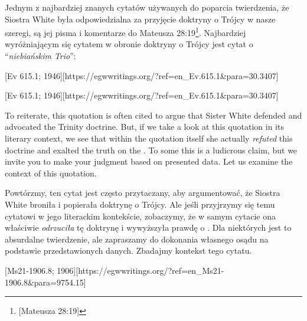 Jednym z najbardziej znanych cytatów używanych do poparcia twierdzenia, że Siostra White była odpowiedzialna za przyjęcie doktryny o Trójcy w nasze szeregi, są jej pisma i komentarze do Mateusza 28:19\footnote{[Mateusza 28:19]}. Najbardziej wyróżniającym się cytatem w obronie doktryny o Trójcy jest cytat o “\textit{niebiańskim Trio}”:


[Ev 615.1; 1946][https://egwwritings.org/?ref=en\_Ev.615.1&para=30.3407]


[Ev 615.1; 1946][https://egwwritings.org/?ref=en\_Ev.615.1&para=30.3407]


To reiterate, this quotation is often cited to argue that Sister White defended and advocated the Trinity doctrine. But, if we take a look at this quotation in its literary context, we see that within the quotation itself she actually \textit{refuted} this doctrine and exalted the truth on the . To some this is a ludicrous claim, but we invite you to make your judgment based on presented data. Let us examine the context of this quotation.


Powtórzmy, ten cytat jest często przytaczany, aby argumentować, że Siostra White broniła i popierała doktrynę o Trójcy. Ale jeśli przyjrzymy się temu cytatowi w jego literackim kontekście, zobaczymy, że w samym cytacie ona właściwie \textit{odrzuciła} tę doktrynę i wywyższyła prawdę o . Dla niektórych jest to absurdalne twierdzenie, ale zapraszamy do dokonania własnego osądu na podstawie przedstawionych danych. Zbadajmy kontekst tego cytatu.


[Ms21-1906.8; 1906][https://egwwritings.org/?ref=en\_Ms21-1906.8&para=9754.15]


